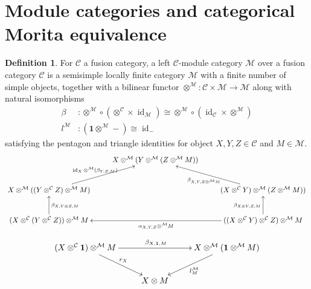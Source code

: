 \documentclass[11pt]{book}
\theoremstyle{Rem}
\theoremstyle{definition}
\newtheorem{Def}[theorem]{Definition}
\numberwithin{equation}{section}
\newcommand\id{\operatorname{id}}
\newcommand\M{\mathcal{M}}
\newcommand\C{\mathcal C}
\newcommand{\ra}\rightarrow
\newcommand\one{\mathbf{1}}
\begin{document}
\section{Module categories and categorical Morita equivalence}\label{section:module-categories}
\begin{Def}\rm\label{modulecategorydef}
For $\C$ a fusion category, a left $\C$-module category $\M$ over a fusion category $\C$ is a semisimple locally finite category $\M$ with a finite number of simple objects,  together with a bilinear functor $\otimes^{\M}: \C\times \M\ra \M$ along with natural isomorphisms \begin{align}
	\beta &: \otimes^{\M} \circ (\otimes ^{\C} \times \id_{\M})\cong  \otimes^{\M} \circ (\id_{\C} \times \otimes^{\M})\\
	l^\M &: (\one \otimes^{\M} - ) \cong \id_{-}
\end{align}
satisfying the pentagon and triangle identities for object $X, Y, Z \in \C$ and $M\in \M$.
\[
  \xymatrix{&  X\otimes^\M (Y\otimes^\M (Z \otimes^\M M)) & \\ 
  X\otimes^\M ((Y\otimes^\C Z) \otimes^\M M) \ar[ru]^{\id_X \otimes^\M (\beta_{Y, Z, M})} &  & (X\otimes^\C Y)\otimes^\M (Z \otimes^\M M))\ar[lu]^{\beta_{X, Y, Z\otimes^\M M}}\\ 
  (X\otimes^\C (Y\otimes^\C Z)) \otimes^\M M \ar[u]_{\beta_{X, Y\otimes Z, M}} &  &  \ar[ll]^{\alpha_{X, Y, Z}\otimes^\M M} ((X\otimes^\C Y)\otimes^\C Z) \otimes^\M M\ar[u]^{\beta_{X\otimes Y, Z, M}} }
\]
\[
\xymatrix{(X\otimes^\C \one) \otimes^\M M \ar[rr]^{\beta_{X, \one, M}}\ar[dr]^{r_X} && X\otimes^\M(\one \otimes^\M M)\ar[dl]^{l^\M_M}\\
& X\otimes M }
\]
\end{Def}
\end{document}
